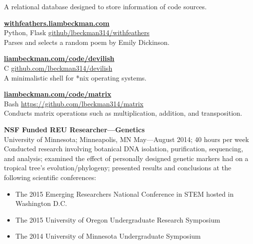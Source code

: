 \documentclass[a4paper]{article}
\begin{document}
A relational database designed to store information of code sources.


\medskip

\textbf{\href{https://withfeathers.liambeckman.com}{withfeathers.liambeckman.com}}\\
\textcolor[RGB]{128,128,128}{Python, Flask \hfill \href{https://github.com/lbeckman314/withfeathers}{github/lbeckman314/withfeathers}}\\

Parses and selects a random poem by Emily Dickinson.


\medskip

\textbf{\href{https://liambeckman.com/code/devilish}{liambeckman.com/code/devilish}}\\
\textcolor[RGB]{128,128,128}{C \hfill \href{https://github.com/lbeckman314/devilsh}{github.com/lbeckman314/devilish}}\\

A minimalistic shell for *nix operating systems.


\medskip

\textbf{\href{https://liambeckman.com/code/matrix}{liambeckman.com/code/matrix}}\\
\textcolor[RGB]{128,128,128}{Bash \hfill \href{https://github.com/lbeckman314/matrix}{https://github.com/lbeckman314/matrix}}\\

Conducts matrix operations such as multiplication, addition, and transposition.



\medskip

\textbf{NSF Funded REU Researcher—Genetics}\\
\textcolor[RGB]{128,128,128}{University of Minnesota; Minneapolis, MN \hfill  May—August 2014; 40 hours per week}\\
Conducted research involving botanical DNA isolation, purification, sequencing, and analysis; examined the effect of personally designed genetic markers had on a tropical tree's evolution/phylogeny; presented results and conclusions at the following scientific conferences:\\ 
\begin{itemize}
\item The 2015 Emerging Researchers National Conference in STEM hosted in Washington D.C.
\item The 2015 University of Oregon Undergraduate Research Symposium
\item The 2014 University of Minnesota Undergraduate Symposium
\end{itemize}
\end{document}
